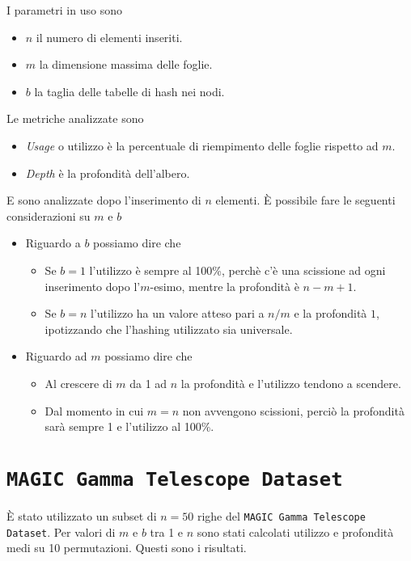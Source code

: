 \documentclass[a4paper]{article}
\begin{document}
	I parametri in uso sono
	\begin{itemize}
		\item $n$ il numero di elementi inseriti.
		\item $m$ la dimensione massima delle foglie.
		\item $b$ la taglia delle tabelle di hash nei nodi.
	\end{itemize}
	Le metriche analizzate sono
	\begin{itemize}
		\item \textit{Usage} o utilizzo è la percentuale di riempimento delle foglie rispetto ad $m$.
		\item \textit{Depth} è la profondità dell'albero.
	\end{itemize}
	E sono analizzate dopo l'inserimento di $n$ elementi. È possibile fare le seguenti considerazioni su $m$ e $b$
	\begin{itemize}
		\item Riguardo a $b$ possiamo dire che
		\begin{itemize}
			\item Se $b = 1$ l'utilizzo è sempre al 100\%, perchè c'è una scissione ad ogni inserimento dopo l'$m$-esimo, mentre la profondità è $n - m + 1$.
			\item Se $b = n$ l'utilizzo ha un valore atteso pari a $n/m$ e la profondità $1$, ipotizzando che l'hashing utilizzato sia universale. 
		\end{itemize}
		\item Riguardo ad $m$ possiamo dire che
		\begin{itemize}
			\item Al crescere di $m$ da 1 ad $n$ la profondità e l'utilizzo tendono a scendere. 
			\item Dal momento in cui $m = n$ non avvengono scissioni, perciò la profondità sarà sempre 1 e l'utilizzo al 100\%.
		\end{itemize}
	\end{itemize}

	\pagebreak

	\section*{\texttt{MAGIC Gamma Telescope Dataset}}

	È stato utilizzato un subset di $n = 50$ righe del \texttt{MAGIC Gamma Telescope Dataset}. Per valori di $m$ e $b$ tra 1 e $n$ sono stati calcolati utilizzo e profondità medi su 10 permutazioni. Questi sono i risultati.
\end{document}
